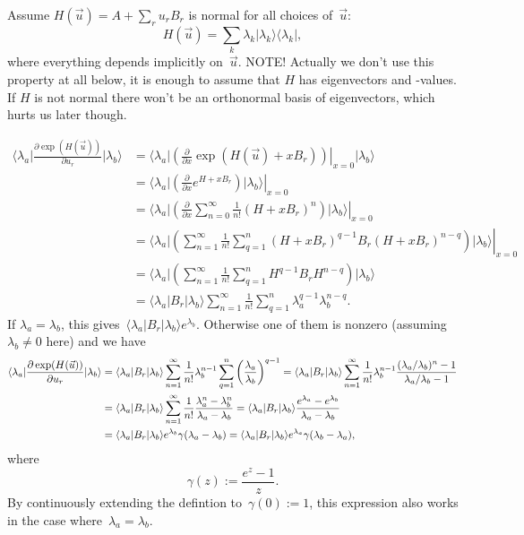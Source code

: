 \documentclass[aps,pra,12pt,showpacs,showkeys,nofootinbib,superscriptaddress,longbibliography]{revtex4}
\newcommand{\bra}[1]{\mbox{$\langle #1|$}}
\newcommand{\ket}[1]{\mbox{$|#1\rangle$}}
\newcommand{\ketbra}[2]{\mbox{$|#1\rangle\langle #2|$}}
\newcommand{\pde}[2]{\frac{\partial #1}{\partial #2}}
\newcommand{\be}{\begin{equation}}
\newcommand{\ee}{\end{equation}}
\begin{document}
Assume $H(\vec{u}) = A +\sum_{r} u_{r} B_r$ is normal for all choices of~$\vec{u}$:
\be
H(\vec{u}) = \sum_k \lambda_k \ketbra{\lambda_k}{\lambda_k},
\ee
where everything depends implicitly on~$\vec{u}$.
NOTE! Actually we don't use this property at all below, it is enough
to assume that $H$ has eigenvectors and -values.
If $H$ is not normal there won't be an orthonormal basis of eigenvectors, which
hurts us later though.


\begin{align*}
\bra{\lambda_a} \pde{\exp(H(\vec{u}))}{u_{r}} \ket{\lambda_b} 
&=
\bra{\lambda_a} \left. \left(\pde{}{x} \exp(H(\vec{u}) +x
B_r)\right)\right|_{x = 0}  \ket{\lambda_b}\\
&=
\left. \bra{\lambda_a} \left(\pde{}{x} e^{H +x B_r}\right)
\ket{\lambda_b} \right|_{x = 0}\\
&=
\left. \bra{\lambda_a} \left(\pde{}{x} \sum_{n=0}^\infty
\frac{1}{n!}(H +x B_r)^n \right) \ket{\lambda_b} \right|_{x = 0}\\
&=
\left. \bra{\lambda_a} \left(\sum_{n=1}^\infty \frac{1}{n!}
\sum_{q=1}^n (H +x B_r)^{q-1} B_r (H +x B_r)^{n-q} \right) \ket{\lambda_b} \right|_{x = 0}\\
&=
\bra{\lambda_a} \left(\sum_{n=1}^\infty \frac{1}{n!}
\sum_{q=1}^n H^{q-1} B_r H^{n-q} \right) \ket{\lambda_b}\\
&=
\bra{\lambda_a} B_r \ket{\lambda_b} \sum_{n=1}^\infty \frac{1}{n!}
\sum_{q=1}^n \lambda_a^{q-1} \lambda_b^{n-q}.
\end{align*}
If $\lambda_a = \lambda_b$, this gives~$\bra{\lambda_a} B_r \ket{\lambda_b} e^{\lambda_b}$.
Otherwise one of them is nonzero (assuming $\lambda_b \neq 0$ here)
and we have
\begin{align}
\notag
\bra{\lambda_a} \pde{\exp(H(\vec{u}))}{u_{r}} \ket{\lambda_b} 
&=
\bra{\lambda_a} B_r \ket{\lambda_b} \sum_{n=1}^\infty \frac{1}{n!}
\lambda_b^{n-1} \sum_{q=1}^n \left(\frac{\lambda_a}{\lambda_b} \right)^{q-1}
=
\bra{\lambda_a} B_r \ket{\lambda_b} \sum_{n=1}^\infty \frac{1}{n!}
\lambda_b^{n-1} \frac{(\lambda_a/\lambda_b)^n-1}{\lambda_a/\lambda_b - 1}\\
\notag
&=
\bra{\lambda_a} B_r \ket{\lambda_b} \sum_{n=1}^\infty \frac{1}{n!}
\frac{\lambda_a^n - \lambda_b^n}{\lambda_a - \lambda_b}
=
\bra{\lambda_a} B_r \ket{\lambda_b}
\frac{e^{\lambda_a} - e^{\lambda_b}}{\lambda_a - \lambda_b}\\
&=
\bra{\lambda_a} B_r \ket{\lambda_b} e^{\lambda_b} \gamma(\lambda_a - \lambda_b)
=
\bra{\lambda_a} B_r \ket{\lambda_b} e^{\lambda_a} \gamma(\lambda_b - \lambda_a),
\label{eq:expgrad}
\end{align}
where
\be
\gamma(z) := \frac{e^z - 1}{z}.
\ee
By continuously extending the defintion to~$\gamma(0) := 1$, this
expression also works in the case where~$\lambda_a = \lambda_b$.
\end{document}
